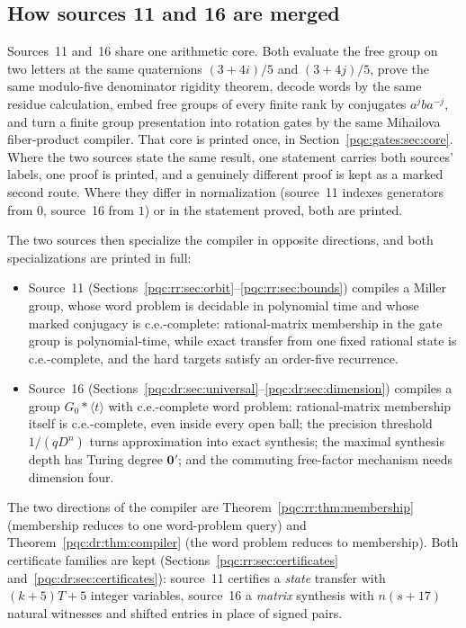 \documentclass[11pt,letterpaper]{article}
\numberwithin{equation}{section}
\theoremstyle{definition}
\theoremstyle{remark}
\begin{document}
\subsection{How sources 11 and 16 are merged}
\label{pqc:gates:sec:plan}
Sources~11 and~16 share one arithmetic core. Both evaluate the free group on
two letters at the same quaternions $(3+4i)/5$ and $(3+4j)/5$, prove the same
modulo-five denominator rigidity theorem, decode words by the same residue
calculation, embed free groups of every finite rank by conjugates $a^jba^{-j}$,
and turn a finite group presentation into rotation gates by the same Mihailova
fiber-product compiler. That core is printed once, in
Section~\ref{pqc:gates:sec:core}. Where the two sources state the same result,
one statement carries both sources' labels, one proof is printed, and a
genuinely different proof is kept as a marked second route. Where they differ in
normalization (source~11 indexes generators from $0$, source~16 from $1$) or in
the statement proved, both are printed.

The two sources then specialize the compiler in opposite directions, and both
specializations are printed in full:
\begin{itemize}
\item Source~11 (Sections~\ref{pqc:rr:sec:orbit}--\ref{pqc:rr:sec:bounds})
compiles a Miller group, whose word problem is decidable in polynomial time and
whose marked conjugacy is c.e.-complete: rational-matrix membership in the gate
group is polynomial-time, while exact transfer from one fixed rational state is
c.e.-complete, and the hard targets satisfy an order-five recurrence.
\item Source~16 (Sections~\ref{pqc:dr:sec:universal}--\ref{pqc:dr:sec:dimension})
compiles a group $G_0*\langle t\rangle$ with c.e.-complete word problem:
rational-matrix membership itself is c.e.-complete, even inside every open ball;
the precision threshold $1/(qD^n)$ turns approximation into exact synthesis; the
maximal synthesis depth has Turing degree $\mathbf0'$; and the commuting
free-factor mechanism needs dimension four.
\end{itemize}
The two directions of the compiler are Theorem~\ref{pqc:rr:thm:membership}
(membership reduces to one word-problem query) and
Theorem~\ref{pqc:dr:thm:compiler} (the word problem reduces to membership).
Both certificate families are kept (Sections~\ref{pqc:rr:sec:certificates}
and~\ref{pqc:dr:sec:certificates}): source~11 certifies a \emph{state} transfer
with $(k+5)T+5$ integer variables, source~16 a \emph{matrix} synthesis with
$n(s+17)$ natural witnesses and shifted entries in place of signed pairs.
\end{document}

